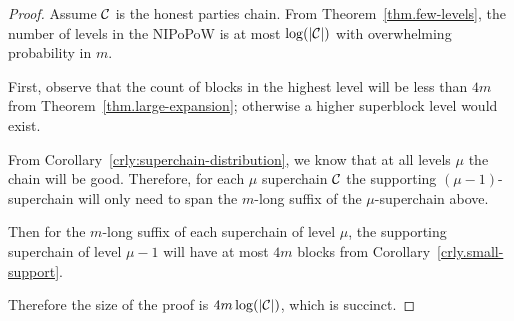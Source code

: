 \begin{proof}
    Assume $\mathcal{C}$ is the honest parties chain. From
    Theorem~\ref{thm.few-levels}, the number of levels in the NIPoPoW is at most
    $\log(|\mathcal{C}|)$ with overwhelming probability in $m$.

    First, observe that the count of blocks in the highest level will be less
    than $4m$ from Theorem~\ref{thm.large-expansion}; otherwise a higher
    superblock level would exist.

    From Corollary~\ref{crly:superchain-distribution}, we know that at all
    levels $\mu$ the chain will be good. Therefore, for each $\mu$ superchain
    $\mathcal{C}$ the supporting $(\mu - 1)$-superchain will only need to span the
    $m$-long suffix of the $\mu$-superchain above.

    Then for the $m$-long suffix of each superchain of level $\mu$, the
    supporting superchain of level $\mu - 1$ will have at most $4m$ blocks from
    Corollary~\ref{crly.small-support}.

    Therefore the size of the proof is $4m \log(|\mathcal{C}|)$, which is succinct.
\end{proof}
